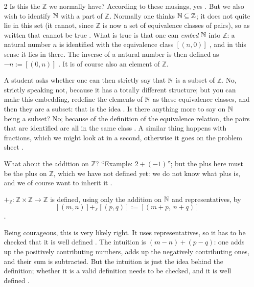 \begin{paracol}{2}
Is this the $\mathbb Z$ we normally have? According to these musings, yes . But we also wish
to identify $\mathbb{N}$ with a part of $\mathbb Z$. Normally one thinks $\mathbb{N}\subseteq\mathbb Z$; it does not quite lie in this set
(it cannot, since $\mathbb Z$ is now a set of equivalence classes of pairs), so as written that cannot be true
. What is true is that one can \emph{embed} $\mathbb{N}$ into $\mathbb Z$: a natural number $n$ is
identified with the equivalence class $[(n,0)]$ , and in this sense it lies in
there. The inverse of a natural number is then defined as $-n:=[(0,n)]$ .
It is of course also an element of $\mathbb Z$.

A student asks whether one can then strictly say that $\mathbb{N}$ is a subset of $\mathbb Z$. No, strictly speaking not, because it
has a totally different structure; but you can make this embedding, redefine the elements of $\mathbb{N}$ as these
equivalence classes, and then they are a subset: that is the idea . Is there
anything more to say on $\mathbb{N}$ being a subset? No; because of the definition of the equivalence relation, the pairs that are
identified are all in the same class . A similar thing happens with fractions, which we
might look at in a second, otherwise it goes on the problem sheet .

What about the addition on $\mathbb Z$? ``Example: $2+(-1)$''; but the plus here must be the plus on $\mathbb Z$, which we have
not defined yet: we do not know what plus is, and we of course want to inherit it .

\begin{definition}\label{def:cl-addZ}
$+_{\mathbb Z}\colon\mathbb Z\times\mathbb Z\to\mathbb Z$ is defined, using only the addition on $\mathbb{N}$ and representatives, by
\[
  [(m,n)]+_{\mathbb Z}[(p,q)]:=[(m+p,\ n+q)]
\]
.
\end{definition}
Being courageous, this is very likely right. It uses representatives, so it has to be checked that it is well defined
. The intuition is $(m-n)+(p-q)$: one adds up the positively contributing numbers, adds up the
negatively contributing ones, and their sum is subtracted. But the intuition is just the idea behind the definition; whether it
is a valid definition needs to be checked, and it is well defined .


\end{paracol}
